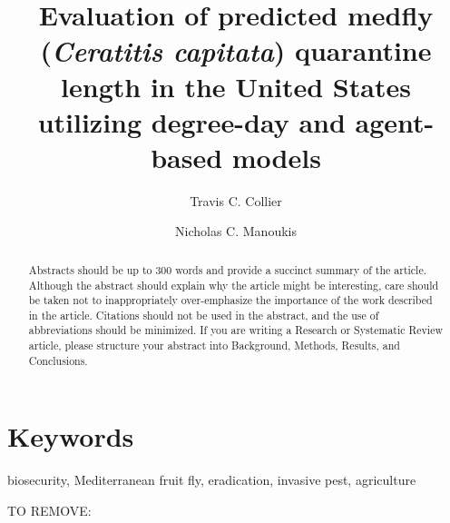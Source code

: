 \documentclass[10pt,a4paper,twocolumn]{article}
\begin{document}
\title{Evaluation of predicted medfly (\textit{Ceratitis capitata}) quarantine length in the United States utilizing degree-day and agent-based models}

\author[1,2]{Travis C. Collier}
\author[1,3]{Nicholas C. Manoukis}

\maketitle
\thispagestyle{fancy}

\begin{abstract}
Abstracts should be up to 300 words and provide a succinct summary of the article. Although the abstract should explain why the article might be interesting, care should be taken not to inappropriately over-emphasize the importance of the work described in the article. Citations should not be used in the abstract, and the use of abbreviations should be minimized. If you are writing a Research or Systematic Review article, please structure your abstract into Background, Methods, Results, and Conclusions.
\end{abstract}

\section*{Keywords}
biosecurity, Mediterranean fruit fly, eradication, invasive pest, agriculture


\clearpage

TO REMOVE:
\end{document}
